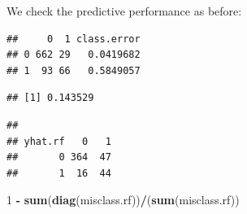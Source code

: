 \documentclass[10pt,ignorenonframetext,]{beamer}
\newenvironment{Shaded}{\begin{snugshade}}{\end{snugshade}}
\newcommand{\KeywordTok}[1]{\textcolor[rgb]{0.13,0.29,0.53}{\textbf{#1}}}
\newcommand{\DataTypeTok}[1]{\textcolor[rgb]{0.13,0.29,0.53}{#1}}
\newcommand{\DecValTok}[1]{\textcolor[rgb]{0.00,0.00,0.81}{#1}}
\newcommand{\StringTok}[1]{\textcolor[rgb]{0.31,0.60,0.02}{#1}}
\newcommand{\OperatorTok}[1]{\textcolor[rgb]{0.81,0.36,0.00}{\textbf{#1}}}
\newcommand{\NormalTok}[1]{#1}
\begin{document}
\begin{frame}[fragile]

We check the predictive performance as before:

\tiny

\begin{Shaded}
\end{Shaded}

\begin{verbatim}
##     0  1 class.error
## 0 662 29   0.0419682
## 1  93 66   0.5849057
\end{verbatim}

\begin{Shaded}
\end{Shaded}

\begin{verbatim}
## [1] 0.143529
\end{verbatim}

\begin{Shaded}
\end{Shaded}

\begin{verbatim}
##        
## yhat.rf   0   1
##       0 364  47
##       1  16  44
\end{verbatim}

\begin{Shaded}
\begin{Highlighting}[]
\DecValTok{1} \OperatorTok{-}\StringTok{ }\KeywordTok{sum}\NormalTok{(}\KeywordTok{diag}\NormalTok{(misclass.rf))}\OperatorTok{/}\NormalTok{(}\KeywordTok{sum}\NormalTok{(misclass.rf))}
\end{Highlighting}
\end{Shaded}


\end{frame}
\end{document}
